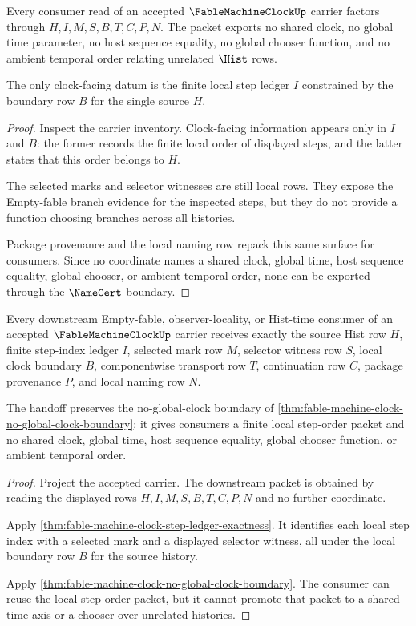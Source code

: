 \begin{theorem}
\label{thm:fable-machine-clock-no-global-clock-boundary}
Every consumer read of an accepted $\FableMachineClockUp$ carrier factors through $H,I,M,S,B,T,C,P,N$. The packet exports no shared clock, no global time parameter, no host sequence equality, no global chooser function, and no ambient temporal order relating unrelated $\Hist$ rows.

The only clock-facing datum is the finite local step ledger $I$ constrained by the boundary row $B$ for the single source $H$.
\end{theorem}
\begin{proof}
Inspect the carrier inventory. Clock-facing information appears only in $I$ and $B$: the former records the finite local order of displayed steps, and the latter states that this order belongs to $H$.

The selected marks and selector witnesses are still local rows. They expose the Empty-fable branch evidence for the inspected steps, but they do not provide a function choosing branches across all histories.

Package provenance and the local naming row repack this same surface for consumers. Since no coordinate names a shared clock, global time, host sequence equality, global chooser, or ambient temporal order, none can be exported through the $\NameCert$ boundary.
\end{proof}

\begin{theorem}
\label{thm:fable-machine-clock-downstream-handoff}
Every downstream Empty-fable, observer-locality, or Hist-time consumer of an accepted $\FableMachineClockUp$ carrier receives exactly the source Hist row $H$, finite step-index ledger $I$, selected mark row $M$, selector witness row $S$, local clock boundary $B$, componentwise transport row $T$, continuation row $C$, package provenance $P$, and local naming row $N$.

The handoff preserves the no-global-clock boundary of \autoref{thm:fable-machine-clock-no-global-clock-boundary}; it gives consumers a finite local step-order packet and no shared clock, global time, host sequence equality, global chooser function, or ambient temporal order.
\end{theorem}
\begin{proof}
Project the accepted carrier. The downstream packet is obtained by reading the displayed rows $H,I,M,S,B,T,C,P,N$ and no further coordinate.

Apply \autoref{thm:fable-machine-clock-step-ledger-exactness}. It identifies each local step index with a selected mark and a displayed selector witness, all under the local boundary row $B$ for the source history.

Apply \autoref{thm:fable-machine-clock-no-global-clock-boundary}. The consumer can reuse the local step-order packet, but it cannot promote that packet to a shared time axis or a chooser over unrelated histories.
\end{proof}

